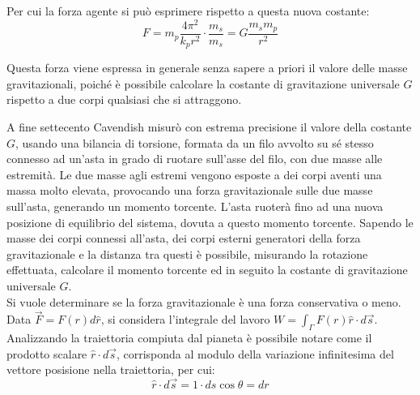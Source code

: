 \documentclass{article}
\numberwithin{equation}{subsection}
\begin{document}
Per cui la forza agente si può esprimere rispetto a questa nuova costante:
\begin{equation}
    F=m_p\displaystyle\frac{4\pi^2}{k_pr^2}\cdot\frac{m_s}{m_s}=G\frac{m_sm_p}{r^2}
\end{equation}

Questa forza viene espressa in generale senza sapere a priori il valore delle masse gravitazionali, poiché è possibile calcolare la costante di gravitazione universale $G$ 
rispetto a due corpi qualsiasi che si attraggono. 


A fine settecento Cavendish misurò con estrema precisione il valore della costante $G$, usando una bilancia di torsione, formata da un filo avvolto 
su sé stesso connesso ad un'asta in grado di ruotare sull'asse del filo, con due masse alle estremità. Le due masse agli estremi vengono esposte 
a dei corpi aventi una massa molto elevata, provocando una forza gravitazionale sulle due masse sull'asta, generando un momento torcente. L'asta ruoterà fino ad una nuova 
posizione di equilibrio del sistema, dovuta a questo momento torcente. Sapendo le masse dei corpi connessi all'asta, dei corpi esterni generatori della forza 
gravitazionale e la distanza tra questi è possibile, misurando la rotazione effettuata, calcolare il momento torcente ed in seguito la costante di gravitazione universale $G$. 
\\
Si vuole determinare se la forza gravitazionale è una forza conservativa o meno. 
Data $\vec{F}=F(r)d\hat{r}$, si considera l'integrale del lavoro $W=\displaystyle\int_{\Gamma}F(r)\hat{r}\cdot d\vec{s}$. Analizzando  
la traiettoria compiuta dal pianeta è possibile notare come il prodotto scalare $\hat{r}\cdot d\vec{s}$, corrisponda al modulo della variazione 
infinitesima del vettore posisione nella traiettoria, per cui:
\begin{equation*}
    \hat{r}\cdot d\vec{s}=1\cdot ds\cos\theta=dr
\end{equation*}

\begin{center}
\end{center}
\end{document}
